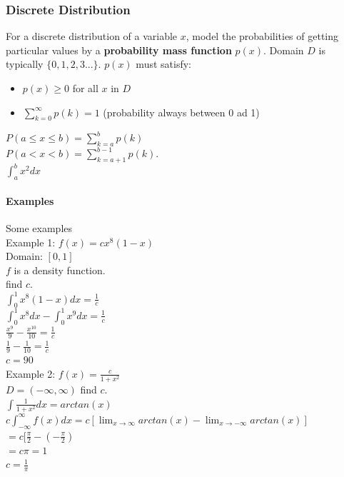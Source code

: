 \documentclass{article}
\newcommand{\p}[1]{\paragraph{#1}} %
\begin{document}
		\subsubsection{Discrete Distribution}
		For a discrete distribution of a variable $x$, model the probabilities of getting particular 
		values by a \textbf{probability mass function} $p(x)$. Domain $D$ is typically 
		$\{0, 1, 2, 3...\}$.
		$p(x)$ must satisfy:
		\begin{itemize}
			\item{$p(x) \ge 0$ for all $x$ in $D$}
			\item{$\sum_{k = 0}^{\infty} p(k) = 1$ (probability always between 0 ad 1)}
		\end{itemize}
	
		 $P(a \le x \le b) = \sum_{k = a}^{b} p(k)$ \\
		 $P(a < x < b) = \sum_{k = a + 1}^{b - 1} p(k)$. \\
		
		 $\int_{a}^{b} x^2 dx$
		
		\p{Examples} Some examples\\
		
		 Example 1: $f(x) = cx^8(1-x)$ \\
		Domain: $[0,1]$ \\
		$f$ is a density function. \\
		find $c$. \\
		
		 $\int_{0}^{1} x^8(1 - x) dx = \frac{1}{c}$ \\
		 $\int_{0}^{1} x^8 dx - \int_{0}^{1} x^9 dx = \frac{1}{c}$ \\
		 $\frac{x^9}{9} - \frac{x^{10}}{10} = \frac{1}{c}$ \\
		 $\frac{1}{9} - \frac{1}{10} = \frac{1}{c}$ \\
		 $c = 90$\\
		
		 Example 2: $f(x) = \frac{c}{1+x^2}$ \\
		$D = (-\infty, \infty)$
		find $c$. \\
		
		 $\int \frac{1}{1 + x^2} dx = arctan(x)$ \\
		 $c\int_{-\infty}^{\infty} f(x) dx = c [\lim_{x\to\infty} arctan(x) - \lim_{x\to -\infty} 
		arctan(x)]$ \\
		 $= c[\frac{\pi}{2} - (-\frac{\pi}{2})$ \\
		 $ = c\pi = 1$ \\
		 $ c = \frac{1}{\pi}$ \\
		
\end{document}
